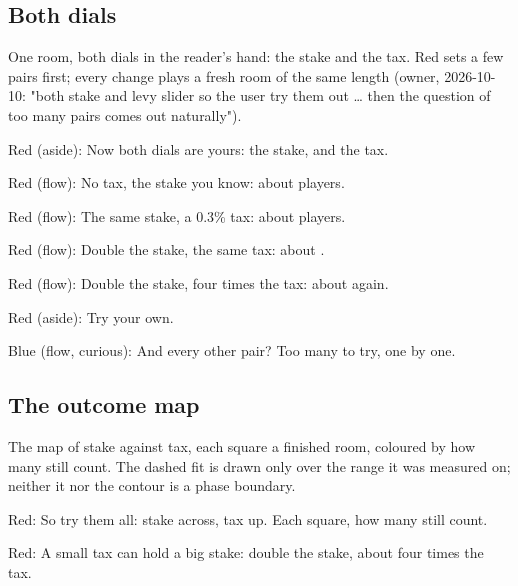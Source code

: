 \subsection{Both dials}\label{act:dials}

\label{dials}

One room, both dials in the reader's hand: the stake and the tax. Red sets a
few pairs first; every change plays a fresh room of the same length (owner,
2026-10-10: "both stake and levy slider so the user try them out … then the
question of too many pairs comes out naturally").

Red (aside): Now both dials are yours:
the stake, and the tax.

Red (flow): No tax, the stake you know:
about  players.

Red (flow): The same stake, a 0.3\% tax:
about  players.

Red (flow): Double the stake, the same tax:
about .

Red (flow): Double the stake, four times the tax:
about  again.

Red (aside): Try your own.

Blue (flow, curious): And every other pair?
Too many to try, one by one.

\subsection{The outcome map}\label{act:map}

\label{map}

The map of stake against tax, each square a finished room, coloured by how
many still count. The dashed fit is drawn only over the range it was
measured on; neither it nor the contour is a phase boundary.

Red: So try them all: stake across, tax up.
Each square, how many still count.

Red: A small tax can hold a big stake:
double the stake, about four times the tax.

